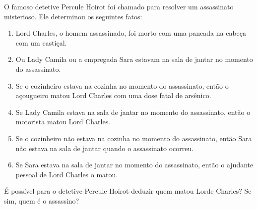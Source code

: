 \item
	O famoso detetive Percule Hoirot foi chamado para resolver um assassinato misterioso. Ele determinou os
seguintes fatos:
\begin{enumerate}
	\item Lord Charles, o homem assassinado, foi morto com uma pancada na cabeça com um castiçal.
	\item  Ou Lady Camila ou a empregada Sara estavam na sala de jantar no momento do assassinato.
	\item Se o cozinheiro estava na cozinha no momento do assassinato, então o açougueiro matou Lord Charles com uma dose fatal de arsênico.
	\item Se Lady Camila estava na sala de jantar no momento do assassinato, então o motorista matou Lord Charles.
	\item Se o cozinheiro não estava na cozinha no momento do assassinato, então Sara não estava na sala de jantar quando o assassinato ocorreu.
		\item Se Sara estava na sala de jantar no momento do assassinato, então o ajudante pessoal de Lord Charles o matou.
\end{enumerate}
É possível para o detetive Percule Hoirot deduzir quem matou Lorde Charles? Se sim, quem é o assassino?

